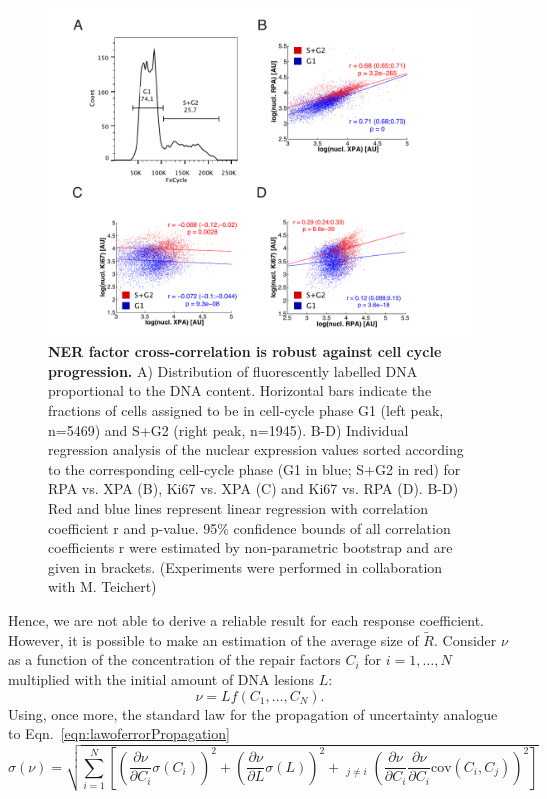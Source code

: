 \begin{figure}[t]
	\begin{center}
		\includegraphics[width=1\textwidth]{Abbildungen/figureTAC_4.pdf}
		\caption{\textbf{NER factor cross-correlation is robust against cell cycle progression.} A) Distribution of fluorescently labelled DNA proportional to the DNA content. Horizontal bars indicate the fractions of cells assigned to be in cell-cycle phase G1 (left peak, n=5469) and S+G2 (right peak, n=1945).  B-D) Individual regression analysis of the nuclear expression values sorted according to the corresponding cell-cycle phase (G1 in blue; S+G2 in red) for RPA vs. XPA (B), Ki67 vs. XPA (C) and Ki67 vs. RPA (D). B-D) Red and blue lines represent linear regression with correlation coefficient r and p-value. 95\% confidence bounds of all correlation coefficients r were estimated by non-parametric bootstrap and are given in brackets. (Experiments were performed in collaboration with M. Teichert)}
		\label{fig:FC_cell_cycle}
	\end{center}
\end{figure}  
Hence, we are not able to derive a reliable result for each response coefficient. However, it is possible to make an estimation of the average size of $\tilde{R}$. Consider $\nu$ as a function of the concentration of the repair factors $C_i$ for $i=1,\ldots,N$ multiplied with the initial amount of DNA lesions $L$:
\begin{equation}
	\nu = Lf(C_1,\ldots,C_N).
\end{equation}
Using, once more, the standard law for the propagation of uncertainty analogue to Eqn.\ \ref{eqn:lawoferrorPropagation}
 \begin{equation}
 \sigma(\nu) = \sqrt{\sum_{i=1}^{N}\left[\left(\frac{\partial \nu}{\partial C_i}\sigma(C_i) \right)^2 + \left(\frac{\partial \nu}{\partial L}\sigma(L)\right)^2 + \mathop{\sum_{j=1}^{N}}_{j\neq i}\left(\frac{\partial \nu}{\partial C_i} \frac{\partial \nu}{\partial C_i}\textrm{cov}(C_i,C_j)\right)^2\right]}
 \end{equation}  
 
